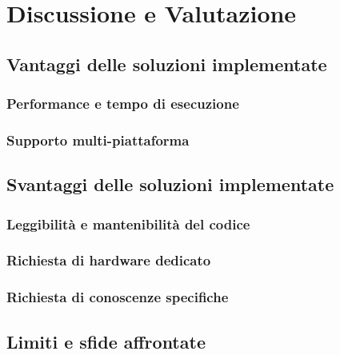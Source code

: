 \chapter{Discussione e Valutazione}
\label{ch:discussione}

\section{Vantaggi delle soluzioni implementate}
\label{sec:vantaggi}

\lipsum[1]

\subsection{Performance e tempo di esecuzione}
\label{subsec:performance}

\lipsum[1]

\subsection{Supporto multi-piattaforma}
\label{subsec:supporto}

\lipsum[1]

\section{Svantaggi delle soluzioni implementate}
\label{sec:svantaggi}

\lipsum[1]

\subsection{Leggibilità e mantenibilità del codice}
\label{subsec:leggibilita}

\lipsum[1]

\subsection{Richiesta di hardware dedicato}
\label{subsec:hardware}

\lipsum[1]

\subsection{Richiesta di conoscenze specifiche}
\label{subsec:conoscenze}

\lipsum[1]

\section{Limiti e sfide affrontate}
\label{sec:limiti}

\lipsum[1]